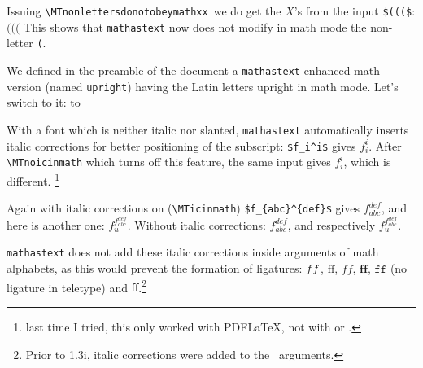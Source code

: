 \documentclass{article}
\begin{document}
Issuing \verb|\MTnonlettersdonotobeymathxx|\MTnonlettersdonotobeymathxx\ we do
get the $X$'s from the input \verb|$((($|: $((($
\endgroup
This shows that \verb|mathastext| now does not modify in math mode the
non-letter \verb|(|.

\MTnonlettersobeymathxx
We defined in the preamble of the document a \verb|mathastext|-enhanced
math version (named \verb|upright|) having the Latin letters upright in
math mode. Let's switch to
it: \newline
\hbox to

With a font which is neither italic nor slanted, \verb|mathastext| automatically
inserts italic corrections for better positioning of the subscript:
\verb|$f_i^i$| gives
$f_i^i$.
After \verb|\MTnoicinmath| which turns off this feature\MTnoicinmath{}, the same
input gives $f_i^i$, which is different.
\footnote{last time I tried, this only worked with PDF\LaTeX{}, not with
  \LuaLaTeX{} or \XeTeX{}.}

Again with italic corrections on (\verb|\MTicinmath|)\MTicinmath{}
\verb|$f_{abc}^{def}$| gives $f_{abc}^{def}$, and here is another one:
$f^{f_{abc}^{def}}_u$. Without italic corrections\MTnoicinmath: $f_{abc}^{def}$,
and respectively $f^{f_{abc}^{def}}_u$.

\MTicinmath

\verb|mathastext| does not add these italic corrections inside arguments of
math alphabets, as this would prevent the formation of ligatures:
$\mathnormal{ff}$, $\mathrm{ff}$, $\mathit{ff}$, $\mathbf{ff}$, $\mathtt{ff}$
(no ligature in teletype) and $\mathsf{ff}$.\footnote{\llap{\textcolor{magenta}{\bfseries Changed!\kern3em}}Prior to 1.3i,
  italic corrections were added to the \string\mathnormal\ arguments.}
\end{document}
